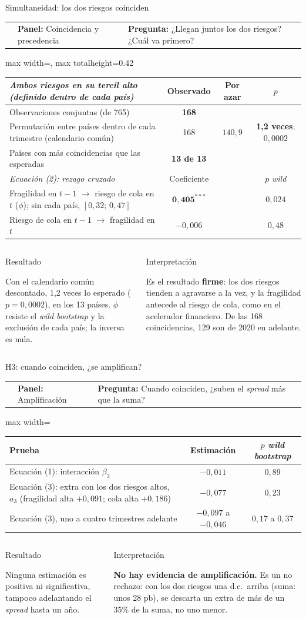 \documentclass[aspectratio=169]{beamer}
\makeatletter
\newcommand{\franja}[3]{\par\vspace{-6pt}\noindent
\colorbox{tesisblue!10}{\begin{minipage}{\dimexpr\textwidth-2\fboxsep\relax}\scriptsize
\begin{tabular}{@{}>{\raggedright\arraybackslash}p{0.13\textwidth}@{\hspace{8pt}}>{\raggedright\arraybackslash}p{0.25\textwidth}@{\hspace{8pt}}>{\raggedright\arraybackslash}p{0.52\textwidth}@{}}
{\color{tesisblue}\bfseries Ecuación #1} & \textbf{Panel:} #2 & \textbf{Pregunta:} #3
\end{tabular}\end{minipage}}\par\vspace{4pt}}
\newcommand{\cajas}[2]{\par\vspace{4pt}
\begin{columns}[T]
\column{0.49\textwidth}
\begin{block}{Resultado}\scriptsize\raggedright #1\end{block}
\column{0.49\textwidth}
\begin{exampleblock}{Interpretación}\scriptsize\raggedright #2\end{exampleblock}
\end{columns}}
\makeatother
\begin{document}
\begin{frame}{Simultaneidad: los dos riesgos coinciden}
\franja{(2)}{Coincidencia y precedencia}{¿Llegan juntos los dos riesgos? ¿Cuál va primero?}
\centering
\footnotesize
\begin{adjustbox}{max width=\textwidth, max totalheight=0.42\textheight}
\begin{tabular}{l ccc}
\toprule
\textit{Ambos riesgos en su tercil alto (definido dentro de cada país)} & Observado & Por azar & $p$ \\
\midrule
Observaciones conjuntas (de 765) & \textbf{168} & & \\
Permutación entre países dentro de cada trimestre (calendario común) & 168 & $140{,}9$ & \textbf{1,2 veces}; $0{,}0002$ \\
Países con más coincidencias que las esperadas & \textbf{13 de 13} & & \\
\midrule
\textit{Ecuación (2): rezago cruzado} & Coeficiente & & $p$ \textit{wild} \\
\midrule
Fragilidad en $t-1$ $\to$ riesgo de cola en $t$ ($\phi$); sin cada país, $[0{,}32;\,0{,}47]$ & $\mathbf{0{,}405^{***}}$ & & $0{,}024$ \\
Riesgo de cola en $t-1$ $\to$ fragilidad en $t$ & $-0{,}006$ & & $0{,}48$ \\
\bottomrule
\end{tabular}
\end{adjustbox}
\cajas{Con el calendario común descontado, 1,2 veces lo esperado ($p=0{,}0002$), en los 13 países. $\phi$ resiste el \textit{wild bootstrap} y la exclusión de cada país; la inversa es nula.}
{Es el resultado \textbf{firme}: los dos riesgos tienden a agravarse a la vez, y la fragilidad antecede al riesgo de cola, como en el acelerador financiero. De las 168 coincidencias, 129 son de 2020 en adelante.}
\end{frame}

\begin{frame}{H3: cuando coinciden, ¿se amplifican?}
\franja{(1) M4 y (3)}{Amplificación}{Cuando coinciden, ¿suben el \textit{spread} más que la suma?}
\centering
\footnotesize
\begin{adjustbox}{max width=\textwidth}
\begin{tabular}{l cc}
\toprule
Prueba & Estimación & $p$ \textit{wild bootstrap} \\
\midrule
Ecuación (1): interacción $\beta_3$ & $-0{,}011$ & $0{,}89$ \\
Ecuación (3): extra con los dos riesgos altos, $a_3$ (fragilidad alta $+0{,}091$; cola alta $+0{,}186$) & $-0{,}077$ & $0{,}23$ \\
Ecuación (3), uno a cuatro trimestres adelante & $-0{,}097$ a $-0{,}046$ & $0{,}17$ a $0{,}37$ \\
\bottomrule
\end{tabular}
\end{adjustbox}
\cajas{Ninguna estimación es positiva ni significativa, tampoco adelantando el \textit{spread} hasta un año.}
{\textbf{No hay evidencia de amplificación.} Es un no rechazo: con los dos riesgos una d.e.\ arriba (suma: unos 28 pb), se descarta un extra de más de un 35\% de la suma, no uno menor.}
\end{frame}
\end{document}
